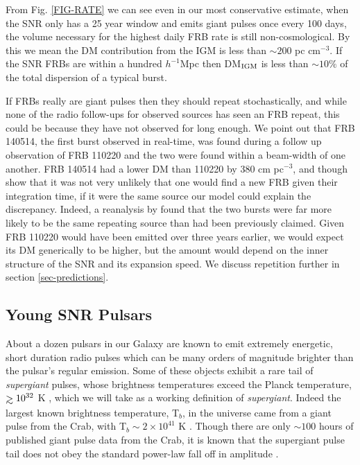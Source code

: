 \documentclass[useAMS,usenatbib]{mn2e}
\def\gtrsim{\mathrel{\hbox{\rlap{\hbox{\lower4pt\hbox{$\sim$}}}\hbox{$>$}}}}
\begin{document}
From Fig. \ref{FIG-RATE} we can see even in our most conservative estimate, when
the SNR only has a 25 year window and emits giant pulses once every
100 days, the volume necessary for the highest daily FRB rate is still non-cosmological.
By this we mean the DM contribution from the IGM is less than $\sim 200$ pc cm$^{-3}$.
If the SNR FRBs are within a hundred $h^{-1}$Mpc then DM$_{\rm IGM}$ is less than 
$\sim 10 \%$  of the total dispersion of a typical burst.

If FRBs really are giant pulses then they 
should repeat stochastically, and while none of the radio follow-ups for 
observed sources has seen an FRB repeat, this could be because they
have not observed for long enough. We point out that FRB 140514, 
the first burst observed in real-time, was found during a follow up observation
of FRB 110220 and the two were found within a beam-width of one another.
FRB 140514 had a lower DM than 110220 by 380 cm pc$^{-3}$, 
and though \cite{2015MNRAS.447..246P} show that it was not very unlikely that one would find a 
new FRB given their integration time, if it were the same source 
our model could explain the discrepancy. Indeed, a reanalysis by 
\cite{2015arXiv150701002M} found that the two bursts were far more likely
to be the same repeating source than had been previously claimed.
Given FRB 110220 would have been emitted over three years earlier, we 
would expect its DM generically to be higher, but the amount would 
depend on the inner structure of the SNR and its expansion speed. 
We discuss repetition further in section \ref{sec-predictions}.

\subsection{Young SNR Pulsars}

About a dozen pulsars in our Galaxy are known to emit extremely energetic,
short duration radio pulses which can be many orders of magnitude 
brighter than the pulsar's regular emission. Some of these objects exhibit 
a rare tail of \textit{supergiant} pulses, whose brightness temperatures 
exceed the Planck temperature, $\gtrsim10^{32}$ K \citep{2004ApJ...612..375C},
which we will take as a working definition of \textit{supergiant}. 
Indeed the largest
known brightness temperature, T$_{b}$, in the universe came from a giant pulse from the Crab,
 with T$_{b}\sim2\times10^{41}$ K \citep{2014ApJ...792..135T}. Though there
are only $\sim100$ hours of published giant pulse data from the Crab, it is known
that the supergiant pulse tail does not obey the standard power-law fall off
in amplitude \citep{2012ApJ...760...64M}.
\end{document}
